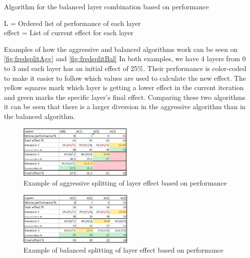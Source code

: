 \begin{algorithm}
    \caption{Algorithm for the balanced layer combination based on performance}
    \SetAlgoLined
    L = Ordered list of performance of each layer \\
    effect  = List of current effect for each layer \\
    \label{alg:bal-layereffect}
\end{algorithm}
Examples of how the aggressive and balanced algorithms work can be seen on \autoref{fig:fredsplitAgg} and \autoref{fig:fredsplitBal}
In both examples, we have 4 layers from 0 to 3 and each layer has an initial effect of 25\%.
Their performance is color-coded to make it easier to follow which values are used to calculate the new effect.
The yellow squares mark which layer is getting a lower effect in the current iteration and green marks the specific layer's final effect.
Comparing these two algorithms it can be seen that there is a larger diversion in the aggressive algorithm than in the balanced algorithm.

\begin{figure}
    \includegraphics[width=0.5\textwidth]{figures/fredsplit/aggresiveAlgo.png}
    \centering
    \caption{Example of aggressive splitting of layer effect based on performance}
    \label{fig:fredsplitAgg}
\end{figure}

\begin{figure}
    \includegraphics[width=0.5\textwidth]{figures/fredsplit/balancedAlgo.png}
    \centering
    \caption{Example of balanced splitting of layer effect based on performance}
    \label{fig:fredsplitBal}
\end{figure}

